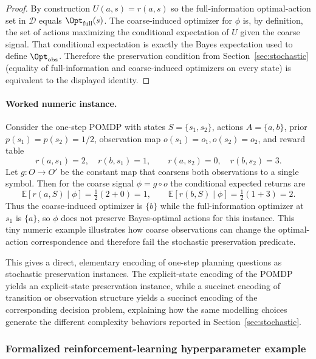 \begin{proof}
By construction $U(a,s)=r(a,s)$ so the full-information optimal-action set in $\mathcal{D}$ equals $\Opt_{\mathrm{full}}(s)$. The coarse-induced optimizer for $\phi$ is, by definition, the set of actions maximizing the conditional expectation of $U$ given the coarse signal. That conditional expectation is exactly the Bayes expectation used to define $\Opt_{\mathrm{obs}}$. Therefore the preservation condition from Section~\ref{sec:stochastic} (equality of full-information and coarse-induced optimizers on every state) is equivalent to the displayed identity.
\end{proof} 

\paragraph{Worked numeric instance.}
Consider the one-step POMDP with states $S=\{s_1,s_2\}$, actions $A=\{a,b\}$, prior $p(s_1)=p(s_2)=1/2$, observation map $o(s_1)=o_1,o(s_2)=o_2$, and reward table
\[
r(a,s_1)=2,\quad r(b,s_1)=1,\qquad r(a,s_2)=0,\quad r(b,s_2)=3.
\]
Let $g:O\to O'$ be the constant map that coarsens both observations to a single symbol. Then for the coarse signal $\phi=g\circ o$ the conditional expected returns are
\[
\mathbb{E}[r(a,S)\mid\phi]=\tfrac12(2+0)=1,\qquad \mathbb{E}[r(b,S)\mid\phi]=\tfrac12(1+3)=2.
\]
Thus the coarse-induced optimizer is $\{b\}$ while the full-information optimizer at $s_1$ is $\{a\}$, so $\phi$ does not preserve Bayes-optimal actions for this instance. This tiny numeric example illustrates how coarse observations can change the optimal-action correspondence and therefore fail the stochastic preservation predicate. 

This gives a direct, elementary encoding of one-step planning questions as stochastic preservation instances. The explicit-state encoding of the POMDP yields an explicit-state preservation instance, while a succinct encoding of transition or observation structure yields a succinct encoding of the corresponding decision problem, explaining how the same modelling choices generate the different complexity behaviors reported in Section~\ref{sec:stochastic}.

\subsubsection{Formalized reinforcement-learning hyperparameter example}

